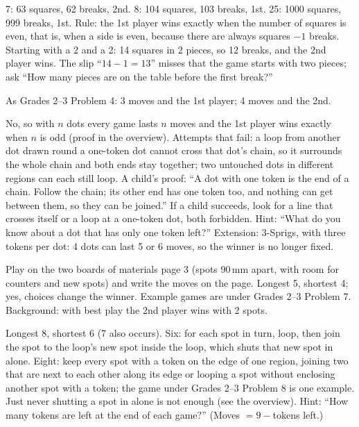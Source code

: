 7: 63 squares, 62 breaks, 2nd. 8: 104 squares, 103 breaks, 1st. 25: 1000 squares, 999 breaks, 1st. Rule: the 1st player wins exactly when the number of squares is even, that is, when a side is even, because there are always squares $-1$ breaks. Starting with a 2 and a 2: 14 squares in 2 pieces, so 12 breaks, and the 2nd player wins. The slip ``$14-1=13$'' misses that the game starts with two pieces; ask ``How many pieces are on the table before the first break?''

As Grades 2--3 Problem 4: 3 moves and the 1st player; 4 moves and the 2nd.

No, so with $n$ dots every game lasts $n$ moves and the 1st player wins exactly when $n$ is odd (proof in the overview). Attempts that fail: a loop from another dot drawn round a one-token dot cannot cross that dot's chain, so it surrounds the whole chain and both ends stay together; two untouched dots in different regions can each still loop. A child's proof: ``A dot with one token is the end of a chain. Follow the chain; its other end has one token too, and nothing can get between them, so they can be joined.'' If a child succeeds, look for a line that crosses itself or a loop at a one-token dot, both forbidden. Hint: ``What do you know about a dot that has only one token left?'' Extension: 3-Sprigs, with three tokens per dot: 4 dots can last 5 or 6 moves, so the winner is no longer fixed.

Play on the two boards of materials page 3 (spots 90\,mm apart, with room for counters and new spots) and write the moves on the page. Longest 5, shortest 4; yes, choices change the winner. Example games are under Grades 2--3 Problem 7. Background: with best play the 2nd player wins with 2 spots.

Longest 8, shortest 6 (7 also occurs). Six: for each spot in turn, loop, then join the spot to the loop's new spot inside the loop, which shuts that new spot in alone. Eight: keep every spot with a token on the edge of one region, joining two that are next to each other along its edge or looping a spot without enclosing another spot with a token; the game under Grades 2--3 Problem 8 is one example. Just never shutting a spot in alone is not enough (see the overview). Hint: ``How many tokens are left at the end of each game?'' (Moves $=9-{}$tokens left.)

